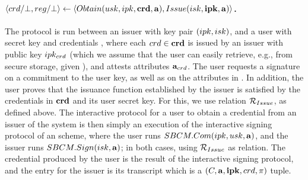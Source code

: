 \paragraph{$\langle crd/\bot,reg/\bot \rangle \gets
  \langle Obtain(usk,ipk,\mathbf{crd},\mathbf{a}),Issue(isk,\mathbf{ipk},\mathbf{a})\rangle$.} %
The protocol is run between an issuer with key pair $(ipk,isk)$, and a user
with secret key \usk and credentials \scred, where each $crd \in \mathbf{crd}$ is
issued by an issuer with
public key $ipk_{crd}$ (which we assume that the user can easily retrieve,
e.g., from secure storage, given \cred), and attests attributes
$\mathbf{a}_{crd}$. The user requests a signature on a commitment to the user key,
as well as on the attributes in \attrs. In addition, the user proves that the
issuance function \fissue established by the issuer is satisfied by the
credentials in $\mathbf{crd}$
and its user secret key. For this, we use relation $\mathcal{R}_{Issue}$, as
defined above. The interactive protocol for a user to obtain a credential from
an issuer of the system is then simply an execution of the interactive signing
protocol of an \SBCM scheme, where the user runs $SBCM.Com(ipk,usk,\mathbf{a})$,
and the issuer runs $SBCM.Sign(isk,\mathbf{a})$; in both cases, using
$\mathcal{R}_{Issue}$ as \NIZK relation. The credential \cred produced by the user
is the result of the interactive signing protocol, and the \utrans entry for
the issuer is its transcript which is a $(C,\mathbf{a},\mathbf{ipk},crd,\pi)$ tuple.

\iffalse
\begin{itemize}
\item \uline{User}: Commit to the user secret key with $\Ccom \gets
  \CCommit(\usk)$. Compute proof $\NIZKproof \gets
  \NIZKProve^{\NIZKRel_{\Issue}}(\NIZKcrs_{\Issue},(\usk,\scred,\attrs_{\scred}),
  (\Ccom,\attrs,\sipk_{\scred}))$. Send $(\Ccom,\NIZKproof)$ to Issuer.
\item \uline{Issuer}: Verify \NIZKproof with $\NIZKVerify^{\NIZKRel_{\Issue}}
  (\NIZKcrs_{\Issue},\NIZKproof,(\Ccom,\attrs,\sipk))$, and abort if it fails. Then,
  compute the credential by running $\cred \gets \SBCMSign(\SBCMsk,\Ccom,
  \attrs)$. Send \cred to User. Output $\utrans \gets (\Ccom,\attrs,\sipk,
  \cred,\NIZKproof)$.
\item \uline{User}: Verify the credential with $\SBCMVerify(\SBCMvk,\cred,
  \attrs \cup \lbrace \usk \rbrace)$. Reject if verification fails.
  Otherwise, return \cred.
\end{itemize}
\fi

